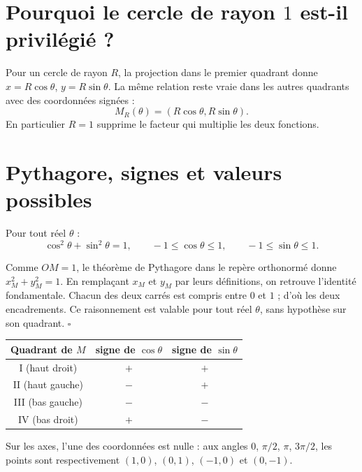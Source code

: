 \documentclass[../cours_spe_trigo.tex]{subfiles}
\begin{document}
\section{Pourquoi le cercle de rayon $1$ est-il privilégié ?}
Pour un cercle de rayon $R$, la projection dans le premier quadrant donne $x=R\cos\theta$, $y=R\sin\theta$. La même relation reste vraie dans les autres quadrants avec des coordonnées signées :
\[\boxed{M_R(\theta)=(R\cos\theta,R\sin\theta).}\]
En particulier $R=1$ supprime le facteur qui multiplie les deux fonctions.

\section{Pythagore, signes et valeurs possibles}
\begin{propriete}
Pour tout réel $\theta$ :
\[\boxed{\cos^2\theta+\sin^2\theta=1,\qquad -1\leq\cos\theta\leq1,\qquad-1\leq\sin\theta\leq1.}\]
\end{propriete}
\begin{demonstration}
Comme $OM=1$, le théorème de Pythagore dans le repère orthonormé donne $x_M^2+y_M^2=1$. En remplaçant $x_M$ et $y_M$ par leurs définitions, on retrouve l'identité fondamentale. Chacun des deux carrés est compris entre $0$ et $1$ ; d'où les deux encadrements. Ce raisonnement est valable pour tout réel $\theta$, sans hypothèse sur son quadrant. $\square$
\end{demonstration}
\begin{center}
\begin{tabular}{c|cc}
\toprule
Quadrant de $M$ & signe de $\cos\theta$ & signe de $\sin\theta$ \\
\midrule
I (haut droit) & $+$ & $+$\\
II (haut gauche) & $-$ & $+$\\
III (bas gauche) & $-$ & $-$\\
IV (bas droit) & $+$ & $-$\\
\bottomrule
\end{tabular}
\end{center}
Sur les axes, l'une des coordonnées est nulle : aux angles $0$, $\pi/2$, $\pi$, $3\pi/2$, les points sont respectivement $(1,0)$, $(0,1)$, $(-1,0)$ et $(0,-1)$.
\end{document}
